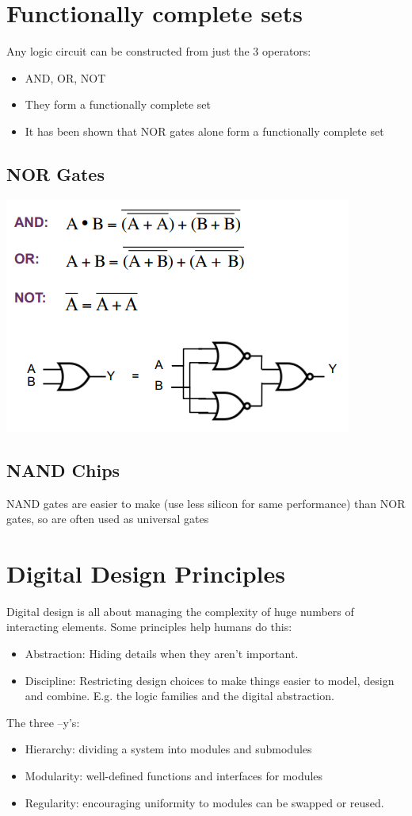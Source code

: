 \documentclass{article}[18pt]
\begin{document}
\section{Functionally complete sets}
Any logic circuit can be constructed from just the 3 operators:
\begin{itemize}
\item AND, OR, NOT
\item They form a functionally complete set
\item It has been shown that NOR gates alone form a functionally complete set
\end{itemize}
\subsection{NOR Gates}
\includegraphics[scale=0.7]{NOR.png}
\subsection{NAND Chips}
NAND gates are easier to make (use less silicon for same performance) than NOR gates, so are often used as universal gates
\section{Digital Design Principles}
Digital design is all about managing the complexity of huge numbers of
interacting elements. Some principles help humans do this:
\begin{itemize}
\item Abstraction: Hiding details when they aren’t important.
\item Discipline: Restricting design choices to make things easier to model, design
and combine. E.g. the logic families and the digital abstraction.
\end{itemize}
The three –y’s:
\begin{itemize}
\item Hierarchy: dividing a system into modules and submodules
\item Modularity: well-defined functions and interfaces for modules
\item Regularity: encouraging uniformity to modules can be swapped or reused.
\end{itemize}
\end{document}
